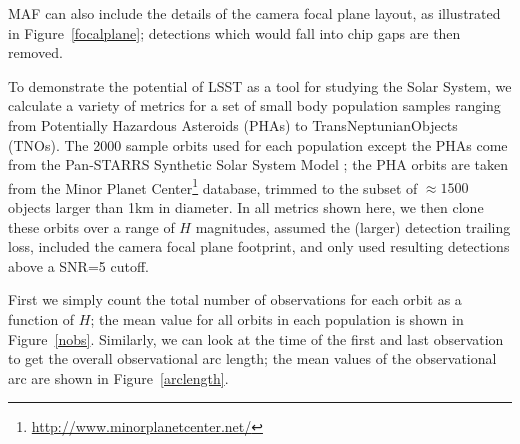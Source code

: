 \documentclass{iau}
\begin{document}
MAF can also include the details of the camera focal plane layout, as
illustrated in Figure~\ref{focalplane}; detections which would fall into
chip gaps are then removed.

To demonstrate the potential of LSST as a tool for studying the
Solar System, we calculate a variety of metrics for a set of small
body population samples ranging from Potentially Hazardous Asteroids
(PHAs) to TransNeptunianObjects (TNOs). The 2000 sample orbits used for each
population except the PHAs come from the Pan-STARRS Synthetic Solar
System Model \cite{s3m}; the PHA orbits are taken from the Minor
Planet Center\footnote{\url{http://www.minorplanetcenter.net/}} database,
trimmed to the subset of $\approx1500$ objects larger than 1km in
diameter. In all metrics shown here, we then clone these orbits over a
range of $H$ magnitudes, assumed the (larger) detection trailing
loss, included the camera focal plane footprint, and only used
resulting detections above a SNR=5 cutoff.

First we simply count the total number of observations for each orbit
as a function of $H$; the mean value for all orbits in each population
is shown in Figure~\ref{nobs}. Similarly, we can look at the time of
the first and last observation to get the overall observational arc
length; the mean values  of the observational arc are shown in
Figure~\ref{arclength}.
\end{document}
